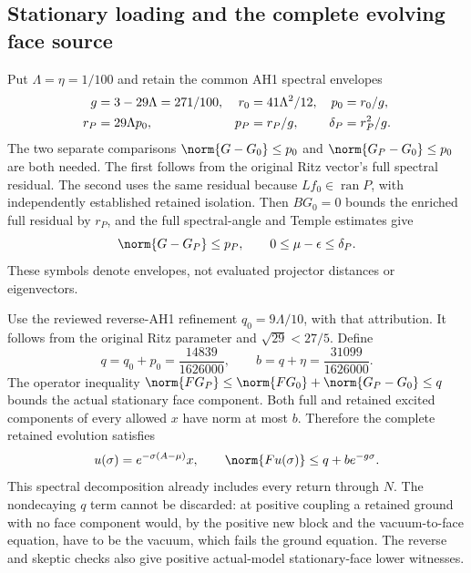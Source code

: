 \subsection{Stationary loading and the complete evolving face source}
Put $\Lambda=\eta=1/100$ and retain the common AH1 spectral envelopes
\begin{align}
 g&=3-29\Lambda=271/100,&
 r_0&=41\Lambda^2/12,& p_0&=r_0/g,\notag\\
 r_P&=29\Lambda p_0,&p_P&=r_P/g,&\delta_P&=r_P^2/g.
 \label{r28:eq:ah2-ground-budgets}
\end{align}
The two separate comparisons $\norm{G-G_0}\le p_0$ and $\norm{G_P-G_0}\le p_0$ are both needed. The first follows from the original Ritz vector's full spectral residual. The second uses the same residual because $Lf_0\in\operatorname{ran}P$, with independently established retained isolation. Then $BG_0=0$ bounds the enriched full residual by $r_P$, and the full spectral-angle and Temple estimates give
\begin{equation}
 \norm{G-G_P}\le p_P,\qquad0\le\mu-\epsilon\le\delta_P.
\end{equation}
These symbols denote envelopes, not evaluated projector distances or eigenvectors.

Use the reviewed reverse-AH1 refinement $q_0=9\Lambda/10$, with that attribution. It follows from the original Ritz parameter and $\sqrt{29}<27/5$. Define
\begin{equation}
 q=q_0+p_0=\frac{14839}{1626000},\qquad
 b=q+\eta=\frac{31099}{1626000}.
\end{equation}
The operator inequality $\norm{FG_P}\le\norm{FG_0}+\norm{G_P-G_0}\le q$ bounds the actual stationary face component. Both full and retained excited components of every allowed $x$ have norm at most $b$. Therefore the complete retained evolution satisfies
\begin{equation}
 u(\sigma)=e^{-\sigma(A-\mu)}x,
 \qquad\norm{Fu(\sigma)}\le q+b e^{-g\sigma}.
 \label{r28:eq:ah2-face-source}
\end{equation}
This spectral decomposition already includes every return through $N$. The nondecaying $q$ term cannot be discarded: at positive coupling a retained ground with no face component would, by the positive new block and the vacuum-to-face equation, have to be the vacuum, which fails the ground equation. The reverse and skeptic checks also give positive actual-model stationary-face lower witnesses.

